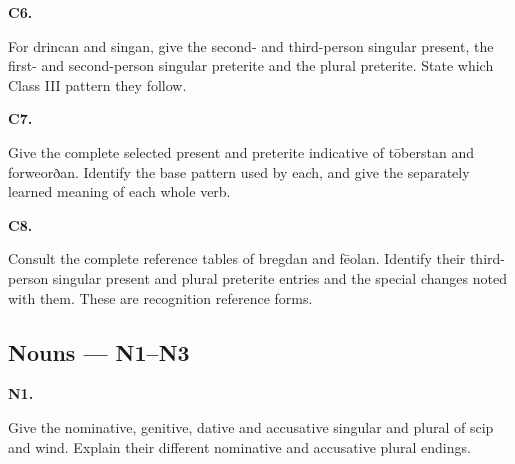 \par\begin{minipage}{\linewidth}\raggedright
\textbf{C6.}

For drincan and singan, give the second- and third-person singular present, the first- and second-person singular preterite and the plural preterite. State which Class III pattern they follow.

\end{minipage}\par\addvspace{4pt}

\par\begin{minipage}{\linewidth}\raggedright
\textbf{C7.}

Give the complete selected present and preterite indicative of tōberstan and forweorðan. Identify the base pattern used by each, and give the separately learned meaning of each whole verb.

\end{minipage}\par\addvspace{4pt}

\par\begin{minipage}{\linewidth}\raggedright
\textbf{C8.}

Consult the complete reference tables of bregdan and fēolan. Identify their third-person singular present and plural preterite entries and the special changes noted with them. These are recognition reference forms.

\end{minipage}\par\addvspace{4pt}

\subsection*{Nouns — N1–N3}

\par\begin{minipage}{\linewidth}\raggedright
\textbf{N1.}

Give the nominative, genitive, dative and accusative singular and plural of scip and wind. Explain their different nominative and accusative plural endings.

\end{minipage}\par\addvspace{4pt}

